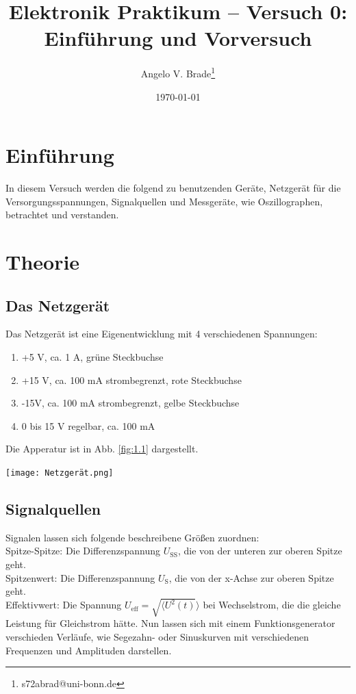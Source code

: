 \documentclass[10pt]{article}
\title{Elektronik Praktikum -- Versuch 0: Einführung und Vorversuch}
\author[1]{Angelo V. Brade\thanks{s72abrad@uni-bonn.de}}
\affil[1]{Rheinische Friedrich-Wilhelms-Universität Bonn}
\date{\today}
\newenvironment{Figure}
  {\par\medskip\noindent\minipage{\linewidth}}
  {\endminipage\par\medskip}
\begin{document}
\maketitle
\newpage

\tableofcontents
\newpage


\pagestyle{fancy}
\fancyhead[R]{\thepage}
\fancyhead[L]{\leftmark}


\begin{multicols}{2}
	\section{\large Einführung}
	In diesem Versuch werden die folgend zu benutzenden Geräte, Netzgerät für die Versorgungsspannungen, Signalquellen und Messgeräte, wie Oszillographen, betrachtet und verstanden.
	\section{\large Theorie}
	\subsection{Das Netzgerät}
	Das Netzgerät ist eine Eigenentwicklung mit 4 verschiedenen Spannungen:
	\begin{enumerate}[itemsep=0.01mm]
		\item +5 V, ca. 1 A, grüne Steckbuchse
		\item +15 V, ca. 100 mA strombegrenzt, rote Steckbuchse
		\item -15V, ca. 100 mA strombegrenzt, gelbe Steckbuchse
		\item 0 bis 15 V regelbar, ca. 100 mA
	\end{enumerate}
	Die Apperatur ist in Abb. \ref{fig:1.1} dargestellt.
	\begin{Figure}
		\centering
		\texttt{[image: Netzgerät.png]}
		\label{fig:1.1}
	\end{Figure}
	\subsection{Signalquellen}
	Signalen lassen sich folgende beschreibene Größen zuordnen:\\
	Spitze-Spitze: Die Differenzspannung \(U_{\text{SS}}\), die von der unteren zur oberen Spitze geht.\\
	Spitzenwert: Die Differenzspannung \(U_{\text{S}}\), die von der x-Achse zur oberen Spitze geht.\\
	Effektivwert: Die Spannung \(U_{\text{eff}}=\sqrt{\langle U^2(t)}\rangle\) bei Wechselstrom, die die gleiche Leistung für Gleichstrom hätte.
	Nun lassen sich mit einem Funktionsgenerator verschieden Verläufe, wie Segezahn- oder Sinuskurven mit verschiedenen Frequenzen und Amplituden darstellen.

\end{multicols}
\end{document}
